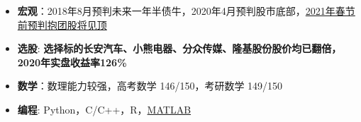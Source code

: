   \begin{itemize}[leftmargin=*]
    \item \textbf{宏观}：2018年8月预判未来一年半债牛，2020年4月预判股市底部，\href{https://xueqiu.com/1376056330/172009168}{2021年春节前预判抱团股将见顶}
    \item \textbf{选股}: \textbf{选择标的长安汽车、小熊电器、分众传媒、隆基股份股价均已翻倍，2020年实盘收益率126\%}
    \item \textbf{数学}：数理能力较强，高考数学 146/150，考研数学 149/150
    \item \textbf{编程}: Python，C/C++，R，\href{https://www.mathworks.com/}{MATLAB}
  \end{itemize}